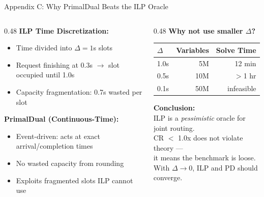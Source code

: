 \documentclass[aspectratio=169,10pt]{beamer}
\begin{document}
\begin{frame}[noframenumbering]
\hypertarget{app:q1}{}{Appendix C: Why PrimalDual Beats the ILP Oracle}
\begin{columns}[T]
\begin{column}{0.48\textwidth}
\textbf{ILP Time Discretization:}
\begin{itemize}\setlength{\itemsep}{2pt}
    \item Time divided into $\Delta=1$s slots
    \item Request finishing at 0.3s $\to$ slot occupied until 1.0s
    \item \alert{Capacity fragmentation}: 0.7s wasted per slot
\end{itemize}

\vspace{0.2cm}
\textbf{PrimalDual (Continuous-Time):}
\begin{itemize}\setlength{\itemsep}{2pt}
    \item Event-driven: acts at exact arrival/completion times
    \item No wasted capacity from rounding
    \item Exploits fragmented slots ILP cannot use
\end{itemize}
\end{column}

\begin{column}{0.48\textwidth}
\textbf{Why not use smaller $\Delta$?}

\vspace{0.1cm}
\footnotesize
\begin{tabular}{lrr}
\toprule
$\Delta$ & Variables & Solve Time \\
\midrule
1.0s & 5M & 12 min \\
0.5s & 10M & $>$1 hr \\
0.1s & 50M & infeasible \\
\bottomrule
\end{tabular}

\vspace{0.2cm}
\normalsize
\textbf{Conclusion:}\\
ILP is a \textit{pessimistic} oracle for joint routing.\\
CR $<$ 1.0x does not violate theory ---\\
it means the benchmark is loose.\\[6pt]
With $\Delta \to 0$, ILP and PD should converge.
\end{column}
\end{columns}
\end{frame}
\end{document}
